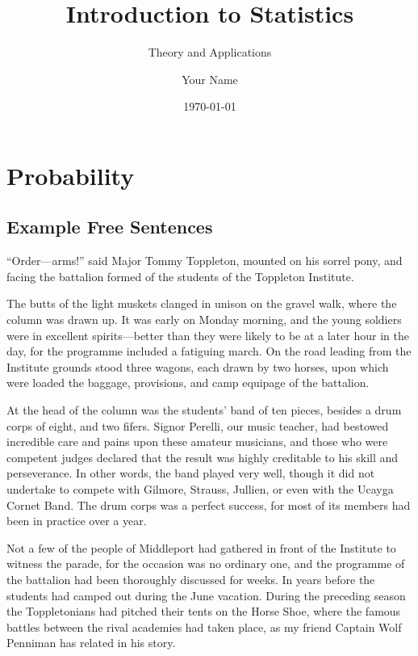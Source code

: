 \documentclass[11pt,a4paper]{book}
\title{Introduction to Statistics}
\subtitle{Theory and Applications}
\author{Your Name}
\date{\today}
\begin{document}
\maketitle
\tableofcontents

\chapter{Probability}

\section{Example Free Sentences}

“Order—arms!” said Major Tommy Toppleton, mounted on his sorrel pony, and facing the battalion formed of the students of the Toppleton Institute.

The butts of the light muskets clanged in unison on the gravel walk, where the column was drawn up. It was early on Monday morning, and the young soldiers were in excellent spirits—better than they were likely to be at a later hour in the day, for the programme included a fatiguing march. On the road leading from the Institute grounds stood three wagons, each drawn by two horses, upon which were loaded the baggage, provisions, and camp equipage of the battalion.

At the head of the column was the students’ band of ten pieces, besides a drum corps of eight, and two fifers. Signor Perelli, our music teacher, had bestowed incredible care and pains upon these amateur musicians, and those who were competent judges declared that the result was highly creditable to his skill and perseverance. In other words, the band played very well, though it did not undertake to compete with Gilmore, Strauss, Jullien, or even with the Ucayga Cornet Band. The drum corps was a perfect success, for most of its members had been in practice over a year.

Not a few of the people of Middleport had gathered in front of the Institute to witness the parade, for the occasion was no ordinary one, and the programme of the battalion had been thoroughly discussed for weeks. In years before the students had camped out during the June vacation. During the preceding season the Toppletonians had pitched their tents on the Horse Shoe, where the famous battles between the rival academies had taken place, as my friend Captain Wolf Penniman has related in his story.
\end{document}
